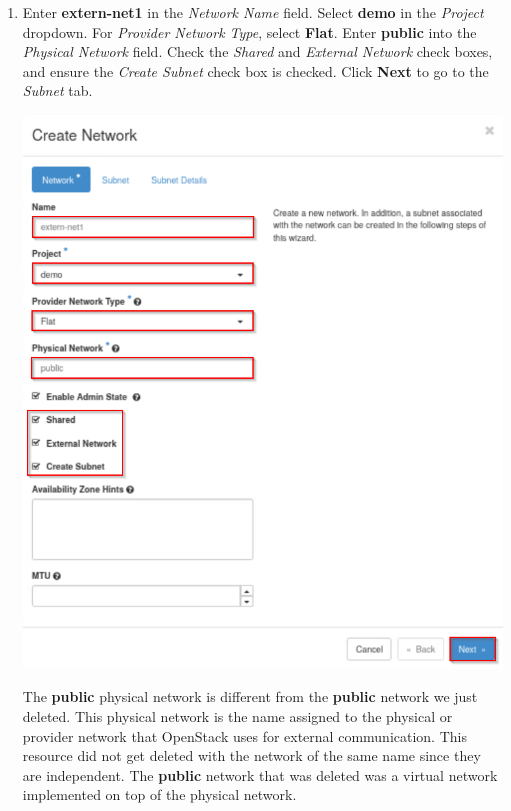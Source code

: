 \documentclass[letterpaper, 12pt]{article}
\begin{document}
\begin{enumerate}
    \item Enter \textbf{extern-net1} in the \textit{Network Name} field. Select \textbf{demo} in the \textit{Project} dropdown.
    For \textit{Provider Network Type}, select \textbf{Flat}. Enter \textbf{public} into the \textit{Physical Network}
    field. Check the \textit{Shared} and \textit{External Network} check boxes, and ensure the \textit{Create Subnet}
    check box is checked. Click \textbf{Next} to go to the \textit{Subnet} tab.

    \begin{center}
        \includegraphics[width=\linewidth]{images/part1/step7.png}
    \end{center}

    \begin{notebox}
        The \textbf{public} physical network is different from the \textbf{public} network we just deleted. This
        physical network is the name assigned to the physical or provider network that OpenStack uses for external
        communication. This resource did not get deleted with the network of the same name since they are independent.
        The \textbf{public} network that was deleted was a virtual network implemented on top of the physical network.
    \end{notebox}


\end{enumerate}
\end{document}
